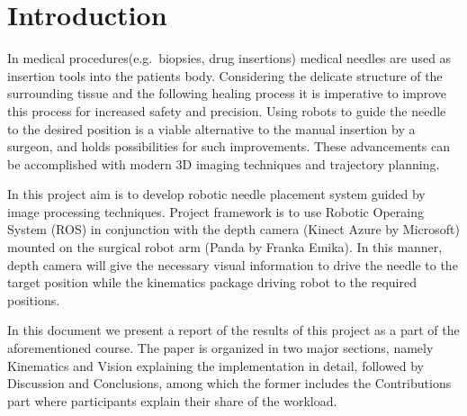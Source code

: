 \section{Introduction}
In medical procedures(e.g.\ biopsies, drug insertions) medical needles are used as insertion tools into the patients body.
Considering the delicate structure of the surrounding tissue and the following healing process it is imperative to improve this process for increased safety and precision.
Using robots to guide the needle to the desired position is a viable alternative to the manual insertion by a surgeon, and holds possibilities for such improvements. These advancements can be accomplished with modern 3D imaging techniques and trajectory planning.

In this project aim is to develop robotic needle placement system guided by image processing techniques.
Project framework is to use Robotic Operaing System (ROS) in conjunction with the depth camera (Kinect Azure by Microsoft) mounted on the surgical robot arm (Panda by Franka Emika).
In this manner, depth camera will give the necessary visual information to drive the needle to the target position while the kinematics package driving robot to the required positions.

In this document we present a report of the results of this project as a part of the aforementioned course.
The paper is organized in two major sections, namely Kinematics and Vision explaining the implementation in detail, followed by Discussion and Conclusions, among which the former includes the Contributions part where participants explain their share of the workload.